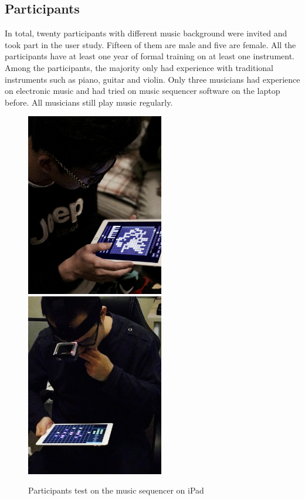 \subsection{Participants}

In total, twenty participants with different music background were invited and took part in the user study. Fifteen of them are male and five are female. All the participants have at least one year of formal training on at least one instrument. Among the participants, the majority only had experience with traditional instruments such as piano, guitar and violin. Only three musicians had experience on electronic music and had tried on music sequencer software on the laptop before. All musicians still play music regularly.

\bigskip
\begin{figure}[h]
  \includegraphics[width=6cm]{images/Participant}
  \includegraphics[width=6cm]{images/Participant2}
  \centering
  \caption{Participants test on the music sequencer on iPad}
  \label{fig: participant}
\end{figure}
\bigskip

